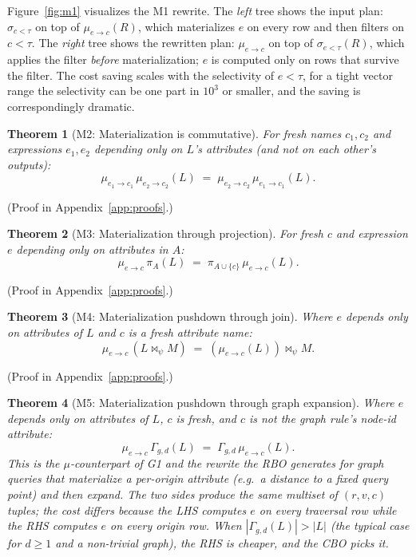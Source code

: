 \documentclass[sigconf]{acmart}
\theoremstyle{plain}
\newtheorem{theorem}{Theorem}
\theoremstyle{definition}
\theoremstyle{remark}
\begin{document}
Figure~\ref{fig:m1} visualizes the M1 rewrite. The \emph{left} tree
shows the input plan: $\sigma_{c<\tau}$ on top of $\mu_{e\to c}(R)$,
which materializes $e$ on every row and then filters on $c < \tau$.
The \emph{right} tree shows the rewritten plan: $\mu_{e\to c}$ on
top of $\sigma_{e<\tau}(R)$, which applies the filter
\emph{before} materialization; $e$ is computed only on rows that
survive the filter. The cost saving scales with the selectivity
of $e < \tau$, for a tight vector range the selectivity can be
one part in $10^3$ or smaller, and the saving is correspondingly
dramatic.

\begin{theorem}[M2: Materialization is commutative]\label{thm:m2}
For fresh names $c_1, c_2$ and expressions $e_1, e_2$ depending
only on $L$'s attributes (and not on each other's outputs):
\[
\mu_{e_1 \to c_1}\, \mu_{e_2 \to c_2}(L)
\;=\;
\mu_{e_2 \to c_2}\, \mu_{e_1 \to c_1}(L).
\]
\end{theorem}

  (Proof in Appendix~\ref{app:proofs}.)

\begin{theorem}[M3: Materialization through projection]\label{thm:m3}
For fresh $c$ and expression $e$ depending only on attributes in $A$:
\[
\mu_{e \to c}\, \pi_A(L) \;=\; \pi_{A \cup \{c\}}\, \mu_{e \to c}(L).
\]
\end{theorem}

  (Proof in Appendix~\ref{app:proofs}.)

\begin{theorem}[M4: Materialization pushdown through join]\label{thm:m4}
Where $e$ depends only on attributes of $L$ and $c$ is a fresh
attribute name:
\[
\mu_{e \to c}\, (L \bowtie_\psi M)
\;=\;
(\mu_{e \to c}(L)) \bowtie_\psi M.
\]
\end{theorem}

  (Proof in Appendix~\ref{app:proofs}.)

\begin{theorem}[M5: Materialization pushdown through graph expansion]\label{thm:m5}
Where $e$ depends only on attributes of $L$, $c$ is fresh, and $c$
is not the graph rule's node-id attribute:
\[
\mu_{e \to c}\, \Gamma_{g, d}(L)
\;=\;
\Gamma_{g, d}\, \mu_{e \to c}(L).
\]
This is the $\mu$-counterpart of G1 and the rewrite the RBO
generates for graph queries that materialize a per-origin attribute
(e.g.\ a distance to a fixed query point) and then expand. The
two sides produce the same multiset of $(r, v, c)$ tuples; the
cost differs because the LHS computes $e$ on every traversal row
while the RHS computes $e$ on every origin row. When
$|\Gamma_{g,d}(L)| > |L|$ (the typical case for $d \geq 1$ and a
non-trivial graph), the RHS is cheaper, and the CBO picks it.
\end{theorem}
\end{document}
